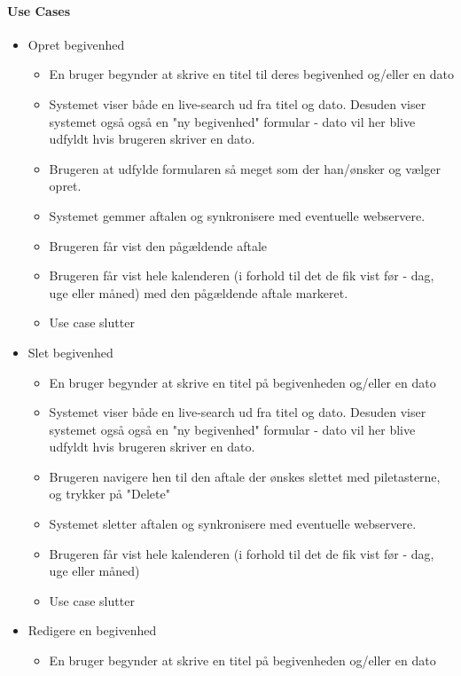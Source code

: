 \documentclass{article}
\begin{document}
   \paragraph{Use Cases}
   \begin{itemize}
   \item Opret begivenhed
   	\begin{itemize}
   	\item En bruger begynder at skrive en titel til deres begivenhed og/eller en dato
   	\item Systemet viser både en live-search ud fra titel og dato. Desuden viser systemet også også en "ny begivenhed" formular - dato vil her blive udfyldt hvis brugeren skriver en dato.
   	
   	\item Brugeren at udfylde formularen så meget som der han/ønsker og vælger opret.
   	\item Systemet gemmer aftalen og synkronisere med eventuelle webservere.
   	\item Brugeren får vist den pågældende aftale
   	\item Brugeren får vist hele kalenderen (i forhold til det de fik vist før - dag, uge eller måned) med den pågældende aftale markeret.
   	\item Use case slutter
   	\end{itemize}
   \item Slet begivenhed
   \begin{itemize}
   	\item En bruger begynder at skrive en titel på begivenheden og/eller en dato
   	\item Systemet viser både en live-search ud fra titel og dato. Desuden viser systemet også også en "ny begivenhed" formular - dato vil her blive udfyldt hvis brugeren skriver en dato.
   	\item Brugeren navigere hen til den aftale der ønskes slettet med piletasterne, og trykker på "Delete"
   	\item Systemet sletter aftalen og synkronisere med eventuelle webservere.
   	\item Brugeren får vist hele kalenderen (i forhold til det de fik vist før - dag, uge eller måned)
   	\item Use case slutter
   	\end{itemize}
   \item Redigere en begivenhed
    \begin{itemize}
   	\item En bruger begynder at skrive en titel på begivenheden og/eller en dato

\end{itemize}
\end{itemize}
\end{document}
